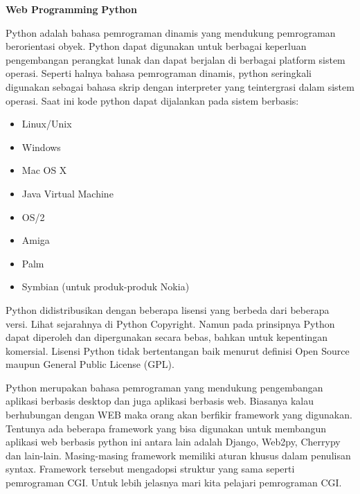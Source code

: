 \begin{enumerate}
\textbf{Web Programming }\textbf{Python} \par
Python adalah bahasa pemrograman dinamis yang mendukung pemrograman berorientasi obyek. Python dapat digunakan untuk berbagai keperluan pengembangan perangkat lunak dan dapat berjalan di berbagai platform sistem operasi. Seperti halnya bahasa pemrograman dinamis, python seringkali digunakan sebagai bahasa skrip dengan interpreter yang teintergrasi dalam sistem operasi. Saat ini kode python dapat dijalankan pada sistem berbasis: \par
\noindent 
\begin{itemize}
	\item Linux/Unix \par
	\noindent 
	\item Windows \par
	\noindent 
	\item Mac OS X \par
	\noindent 
	\item Java Virtual Machine \par
	\noindent 
	\item OS/2 \par
	\noindent 
	\item Amiga \par
	\noindent 
	\item Palm \par
	\noindent 
	\item Symbian (untuk produk-produk Nokia)\end{itemize}
\par
\vspace{12pt}
Python didistribusikan dengan beberapa lisensi yang berbeda dari beberapa versi. Lihat sejarahnya di Python Copyright. Namun pada prinsipnya Python dapat diperoleh dan dipergunakan secara bebas, bahkan untuk kepentingan komersial. Lisensi Python tidak bertentangan baik menurut definisi Open Source maupun General Public License (GPL). \par
\vspace{12pt}
Python merupakan bahasa pemrograman yang mendukung pengembangan aplikasi berbasis desktop dan juga aplikasi berbasis web. Biasanya kalau berhubungan dengan WEB maka orang akan berfikir framework yang digunakan. Tentunya ada beberapa framework yang bisa digunakan untuk membangun aplikasi web berbasis python ini antara lain adalah Django, Web2py, Cherrypy dan lain-lain. Masing-masing framework memiliki aturan khusus dalam penulisan syntax. Framework tersebut mengadopsi struktur yang sama seperti pemrograman CGI. Untuk lebih jelasnya mari kita pelajari pemrograman CGI. \par

\end{enumerate}
